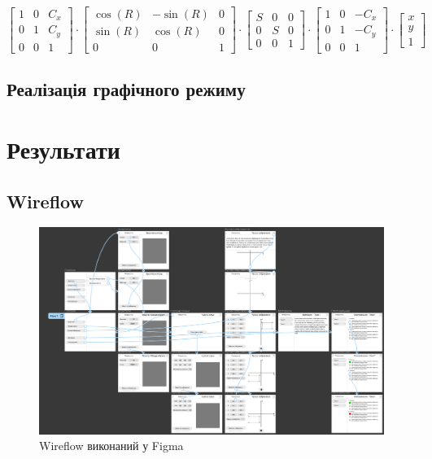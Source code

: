 \documentclass[oneside,14pt]{extarticle}
\begin{document}
\begin{normalsize}
	\[
	\begin{bmatrix} 
		1 & 0 & C_x \\
		0 & 1 & C_y \\
		0 & 0 & 1
	\end{bmatrix} 
	\cdot
	\begin{bmatrix} 
		 \cos(R) & -\sin(R) & 0 \\
		\sin(R) & \cos(R) & 0 \\
		0 & 0 & 1
	\end{bmatrix} 
	\cdot
	\begin{bmatrix} 
		S & 0 & 0 \\
		0 & S & 0 \\
		0 & 0 & 1
	\end{bmatrix}
	\cdot
	\begin{bmatrix} 
		1 & 0 & -C_x \\
		0 & 1 & -C_y \\
		0 & 0 & 1
	\end{bmatrix}
	\cdot
	\begin{bmatrix} 
		x \\
		y \\
		1
	\end{bmatrix} \]
	\subsection{Реалізація графічного режиму}
	
	\section{Результати}
	\subsection{Wireflow}
	\begin{figure}[H]
		\centering
		\includegraphics[scale=0.45]{wireflow}
		\caption{Wireflow виконаний у Figma}
	\end{figure}
	

\end{normalsize}
\end{document}
